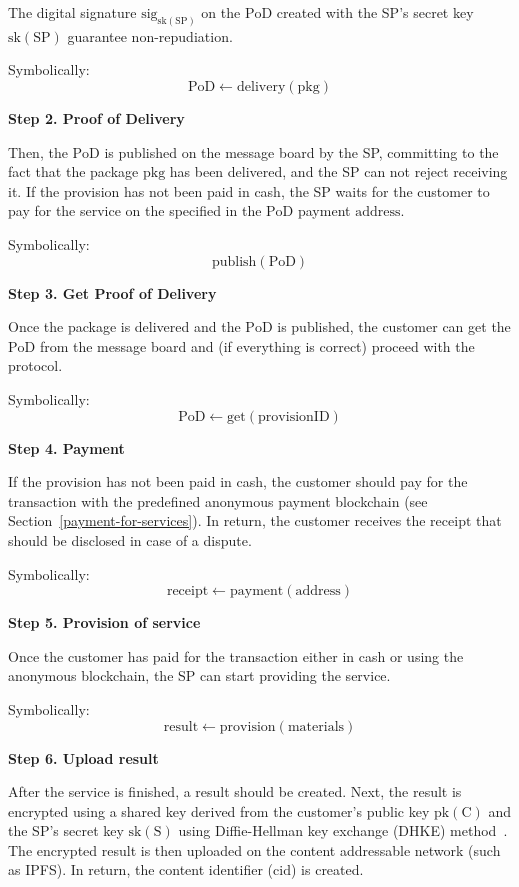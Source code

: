 The digital signature $\mathrm{sig}_{\mathrm{sk}(\mathrm{SP})}$ on the $\mathrm{PoD}$ created with the SP's secret key $\mathrm{sk}(\mathrm{SP})$ guarantee non-repudiation.

Symbolically: 
\[
\mathrm{PoD \gets delivery(pkg)}
\]

\noindent \textbf
{Step 2. Proof of Delivery}\label{step-2-pod}

Then, the $\mathrm{PoD}$ is published on the message board by the SP, committing to the fact that the package $\mathrm{pkg}$ has been delivered, and the SP can not reject receiving it. If the provision has not been paid in cash, the SP waits for the customer to pay for the service on the specified in the $\mathrm{PoD}$ payment $\mathrm{address}$.

Symbolically: 
\[
\mathrm{publish(PoD)}
\]

\noindent \textbf
{Step 3. Get Proof of Delivery}\label{step-3-get-pod}

Once the package is delivered and the $\mathrm{PoD}$ is published, the customer can get the $\mathrm{PoD}$ from the message board and (if everything is correct) proceed with the protocol.

Symbolically: 
\[
\mathrm{PoD \gets get(provisionID)}
\]

\noindent \textbf
{Step 4. Payment}\label{step-4-payment}

If the provision has not been paid in cash, the customer should pay for the transaction with the predefined anonymous payment blockchain (see Section~\ref{payment-for-services}).
In return, the customer receives the $\mathrm{receipt}$ that should be disclosed in case of a dispute.

Symbolically: 
\[
\mathrm{receipt \gets payment(address)}
\]

\noindent \textbf
{Step 5. Provision of service}\label{step-5-provision-of-service} 

Once the customer has paid for the transaction either in cash or using the anonymous blockchain, the SP can start providing the service.

Symbolically: 
\[
\mathrm{result \gets provision(materials)}
\]

\noindent \textbf
{Step 6. Upload result}\label{step-6-upload-result}

After the service is finished, a result should be created. 
Next, the result is encrypted using a shared key derived from the customer's public key $\mathrm{pk(C)}$ and the SP's secret key $\mathrm{sk(S)}$ using Diffie-Hellman key exchange (DHKE) method~\cite{diffieNewDirectionsCryptography1976}.
The encrypted result is then uploaded on the content addressable network (such as IPFS). In return, the content identifier ($\mathrm{cid}$) is created.

